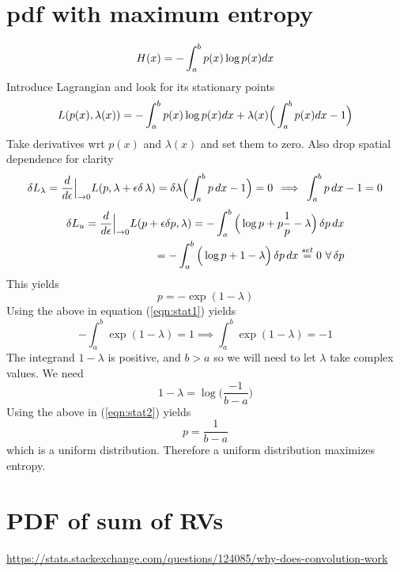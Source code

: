 \documentclass{article}
\newcommand{\beq}{\begin{equation}}
\newcommand{\eeq}{\end{equation}}
\newcommand{\ber}{\begin{eqnarray}}
\newcommand{\eer}{\end{eqnarray}}
\newcommand{\ddeps}{\frac{d}{d\epsilon}\Big{|}_{\rightarrow{0}}}
\begin{document}
\section{pdf with maximum entropy}
\beq
H(x) = -\int_{a}^{b}p(x)\log{p(x)}dx \\
\eeq
Introduce Lagrangian and look for its stationary points
\beq
L(p(x),\lambda(x)) = -\int_{a}^{b}p(x)\log{p(x)}dx  + \lambda(x)\Big(\int_{a}^{b}p(x)dx - 1 \Big)\\
\eeq
Take derivatives wrt $p(x)$ and $\lambda(x)$ and set them to zero. Also drop spatial dependence for clarity
\beq
\label{eqn:stat1}
\delta{}L_{\lambda} = \ddeps L(p,\lambda+\epsilon\delta\,\lambda)=\delta\lambda\Big(\int_a^b {p\,}dx-1\Big) = 0 \, \implies \,\int_a^b {p\,}dx-1=0
\eeq
%
% 
\ber
\delta{}L_u = \ddeps L(p+\epsilon\delta{p},\lambda) = -\int_a^b\Big(\log{p} + p\frac{1}{p} -\lambda\Big)\,\delta{p}\,dx \\
= -\int_a^b\Big(\log{p} + 1 -\lambda\Big)\,\delta{p}\,dx \stackrel{set}{=} 0 \,\,\forall\,\delta{p}
\eer
This yields
%
%
\beq
\label{eqn:stat2}
p = -\exp(1-\lambda)
\eeq
%
%
Using the above in equation (\ref{eqn:stat1}) yields
\beq
-\int_a^b\exp(1-\lambda)=1 \implies \int_a^b\exp(1-\lambda)=-1
\eeq
The integrand $1-\lambda$ is positive, and $b>a$ so we will need to let $\lambda$ take complex values. We need
%
%
\beq
1-\lambda = \log\Big(\frac{-1}{b-a}\Big)
\eeq
Using the above in (\ref{eqn:stat2}) yields
\beq
p = \frac{1}{b-a}
\eeq
which is a uniform distribution. Therefore a uniform distribution maximizes entropy.
%
%
%
\section{PDF of sum of RVs}
\url{https://stats.stackexchange.com/questions/124085/why-does-convolution-work}
%
%
%
\end{document}
